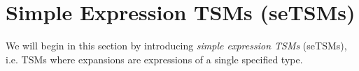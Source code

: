 \documentclass[acmlarge,review,anonymous]{acmart}\settopmatter{printfolios=true}
\newcommand{\li}[1]{\lstinline{#1}}
\begin{document}
\newcommand{\seTSMsSec}{Simple Expression TSMs (seTSMs)}
\section{\protect\seTSMsSec}
\label{sec:setsms}


We will begin in this section by introducing \emph{simple expression TSMs} (seTSMs), i.e. TSMs where expansions are expressions of a single specified type. 





\end{document}
